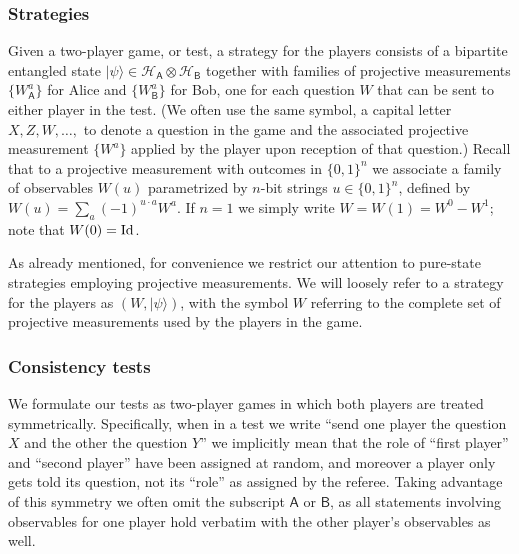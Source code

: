 \documentclass[11pt]{article}
\numberwithin{equation}{section}
\theoremstyle{definition}
\theoremstyle{plain}
\newcommand{\ket}[1]{|#1\rangle}
\newcommand{\Id}{\ensuremath{\mathop{\rm Id}\nolimits}}
\newcommand{\reg}[1]{{\textsf{#1}}}
\newcommand{\mH}{\mathcal{H}}
\begin{document}
\subsubsection{Strategies}

Given a two-player game, or test, a strategy for the players consists of a bipartite entangled state $\ket{\psi} \in \mH_\reg{A} \otimes \mH_\reg{B}$ together with families of projective  measurements $\{W^a_\reg{A}\}$ for Alice and $\{W_\reg{B}^a\}$ for Bob, one for each question $W$ that can be sent to either player in the test. (We often use the same symbol, a capital letter $X,Z,W,\ldots,$ to denote a question in the game and the associated projective measurement $\{W^a\}$ applied by the player upon reception of that question.) 
 Recall that to a projective measurement with outcomes in $\{0,1\}^n$ we  associate a family of observables $W(u)$ parametrized by $n$-bit strings $u\in\{0,1\}^n$, defined by $W(u) = \sum_a (-1)^{u\cdot a} W^a$. If $n=1$ we simply write $W=W(1)=W^0-W^1$; note that $W(0)=\Id$.

As already mentioned, for convenience we restrict our attention to pure-state strategies employing projective measurements. 
We will loosely refer to a strategy for the players as $(W,\ket{\psi})$, with the symbol $W$ referring to the complete set of projective measurements used by the players in the game.

\subsubsection{Consistency tests}
\label{sec:cons-test}

We formulate our tests as two-player games in which both players are treated symmetrically. Specifically, when in a test we write ``send one player the question $X$ and the other the question $Y$'' we implicitly mean that the role of ``first player'' and ``second player'' have been assigned at random, and moreover a player only gets told its question, not its ``role'' as assigned by the referee. 
 Taking advantage of this symmetry we often omit the subscript $\reg{A}$ or $\reg{B}$, as all statements involving observables for one player hold verbatim with the other player's observables as well. 
\end{document}
